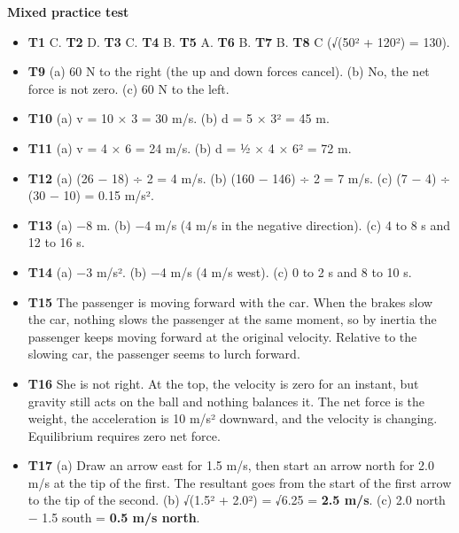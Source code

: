 \documentclass[
]{article}
\providecommand{\tightlist}{%
  \setlength{\itemsep}{0pt}\setlength{\parskip}{0pt}}
\begin{document}
\textbf{Mixed practice test}

\begin{itemize}
\tightlist
\item
  \textbf{T1} C. \textbf{T2} D. \textbf{T3} C. \textbf{T4} B.
  \textbf{T5} A. \textbf{T6} B. \textbf{T7} B. \textbf{T8} C (√(50² +
  120²) = 130).
\item
  \textbf{T9} (a) 60 N to the right (the up and down forces cancel). (b)
  No, the net force is not zero. (c) 60 N to the left.
\item
  \textbf{T10} (a) v = 10 × 3 = 30 m/s. (b) d = 5 × 3² = 45 m.
\item
  \textbf{T11} (a) v = 4 × 6 = 24 m/s. (b) d = ½ × 4 × 6² = 72 m.
\item
  \textbf{T12} (a) (26 − 18) ÷ 2 = 4 m/s. (b) (160 − 146) ÷ 2 = 7 m/s.
  (c) (7 − 4) ÷ (30 − 10) = 0.15 m/s².
\item
  \textbf{T13} (a) −8 m. (b) −4 m/s (4 m/s in the negative direction).
  (c) 4 to 8 s and 12 to 16 s.
\item
  \textbf{T14} (a) −3 m/s². (b) −4 m/s (4 m/s west). (c) 0 to 2 s and 8
  to 10 s.
\item
  \textbf{T15} The passenger is moving forward with the car. When the
  brakes slow the car, nothing slows the passenger at the same moment,
  so by inertia the passenger keeps moving forward at the original
  velocity. Relative to the slowing car, the passenger seems to lurch
  forward.
\item
  \textbf{T16} She is not right. At the top, the velocity is zero for an
  instant, but gravity still acts on the ball and nothing balances it.
  The net force is the weight, the acceleration is 10 m/s² downward, and
  the velocity is changing. Equilibrium requires zero net force.
\item
  \textbf{T17} (a) Draw an arrow east for 1.5 m/s, then start an arrow
  north for 2.0 m/s at the tip of the first. The resultant goes from the
  start of the first arrow to the tip of the second. (b) √(1.5² + 2.0²)
  = √6.25 = \textbf{2.5 m/s}. (c) 2.0 north − 1.5 south = \textbf{0.5
  m/s north}.
\end{itemize}
\end{document}

